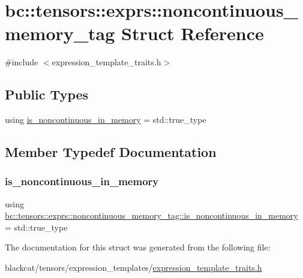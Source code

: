 \hypertarget{structbc_1_1tensors_1_1exprs_1_1noncontinuous__memory__tag}{}\section{bc\+:\+:tensors\+:\+:exprs\+:\+:noncontinuous\+\_\+memory\+\_\+tag Struct Reference}
\label{structbc_1_1tensors_1_1exprs_1_1noncontinuous__memory__tag}


{\ttfamily \#include $<$expression\+\_\+template\+\_\+traits.\+h$>$}

\subsection*{Public Types}
\begin{DoxyCompactItemize}
\item 
using \hyperlink{structbc_1_1tensors_1_1exprs_1_1noncontinuous__memory__tag_a5561ade88d7dec7fef758bb2e8d6a1a1}{is\+\_\+noncontinuous\+\_\+in\+\_\+memory} = std\+::true\+\_\+type
\end{DoxyCompactItemize}


\subsection{Member Typedef Documentation}
\mbox{\label{structbc_1_1tensors_1_1exprs_1_1noncontinuous__memory__tag_a5561ade88d7dec7fef758bb2e8d6a1a1}} 
\subsubsection{\texorpdfstring{is\+\_\+noncontinuous\+\_\+in\+\_\+memory}{is\_noncontinuous\_in\_memory}}
{\footnotesize\ttfamily using \hyperlink{structbc_1_1tensors_1_1exprs_1_1noncontinuous__memory__tag_a5561ade88d7dec7fef758bb2e8d6a1a1}{bc\+::tensors\+::exprs\+::noncontinuous\+\_\+memory\+\_\+tag\+::is\+\_\+noncontinuous\+\_\+in\+\_\+memory} =  std\+::true\+\_\+type}



The documentation for this struct was generated from the following file\+:\begin{DoxyCompactItemize}
\item 
blackcat/tensors/expression\+\_\+templates/\hyperlink{expression__template__traits_8h}{expression\+\_\+template\+\_\+traits.\+h}\end{DoxyCompactItemize}
